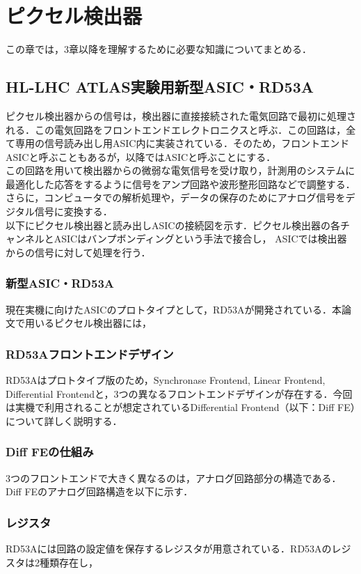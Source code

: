 \chapter{ピクセル検出器}
この章では，3章以降を理解するために必要な知識についてまとめる．

\section{HL-LHC ATLAS実験用新型ASIC・RD53A}
ピクセル検出器からの信号は，検出器に直接接続された電気回路で最初に処理される．この電気回路をフロントエンドエレクトロニクスと呼ぶ．この回路は，全て専用の信号読み出し用ASIC内に実装されている．そのため，フロントエンドASICと呼ぶこともあるが，以降ではASICと呼ぶことにする．\\
この回路を用いて検出器からの微弱な電気信号を受け取り，計測用のシステムに最適化した応答をするように信号をアンプ回路や波形整形回路などで調整する．さらに，コンピュータでの解析処理や，データの保存のためにアナログ信号をデジタル信号に変換する．\\
以下にピクセル検出器と読み出しASICの接続図を示す．ピクセル検出器の各チャンネルとASICはバンプボンディングという手法で接合し， ASICでは検出器からの信号に対して処理を行う．\\

\subsection{新型ASIC・RD53A}
現在実機に向けたASICのプロトタイプとして，RD53Aが開発されている．本論文で用いるピクセル検出器には，

\subsection{RD53Aフロントエンドデザイン}
RD53Aはプロトタイプ版のため，Synchronase Frontend, Linear Frontend, Differential Frontendと，3つの異なるフロントエンドデザインが存在する．今回は実機で利用されることが想定されているDifferential Frontend（以下：Diff FE）について詳しく説明する．

\subsection{Diff FEの仕組み}
3つのフロントエンドで大きく異なるのは，アナログ回路部分の構造である．Diff FEのアナログ回路構造を以下に示す．\\

\subsection{レジスタ}
RD53Aには回路の設定値を保存するレジスタが用意されている．RD53Aのレジスタは2種類存在し，

